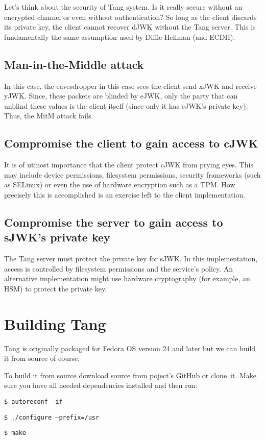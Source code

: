 \documentclass[../xdudla00-porting-Tang-to-Open-WRT.tex]{subfiles}
\begin{document}
Let's think about the security of Tang system. Is it really secure without an encrypted channel or even without authentication?
So long as the client discards its private key, the client cannot recover dJWK without the Tang server.
This is fundamentally the same assumption used by Diffie-Hellman (and ECDH).

\subsection{Man-in-the-Middle attack}
In this case, the eavesdropper in this case sees the client send xJWK and receive yJWK.
Since, these packets are blinded by eJWK, only the party that can unblind these values is the client itself (since only it has eJWK's private key).
Thus, the MitM attack fails.
\subsection{Compromise the client to gain access to cJWK}
It is of utmost importance that the client protect cJWK from prying eyes.
This may include device permissions, filesystem permissions, security frameworks (such as SELinux) or even the use of hardware encryption such as a TPM.
How precisely this is accomplished is an exercise left to the client implementation.
\subsection{Compromise the server to gain access to sJWK's private key}
The Tang server must protect the private key for sJWK.
In this implementation, access is controlled by filesystem permissions and the service's policy.
An alternative implementation might use hardware cryptography (for example, an HSM) to protect the private key.
\section{Building Tang}

Tang is originally packaged for Fedora OS version 24 and later but we can build it from source of course.

To build it from source download source from poject's GitHub or clone~it.
Make sure you have all needed dependencies installed and then run:

{\tt \$ autoreconf -if}

{\tt \$ ./configure --prefix=/usr}

{\tt \$ make}
\end{document}
